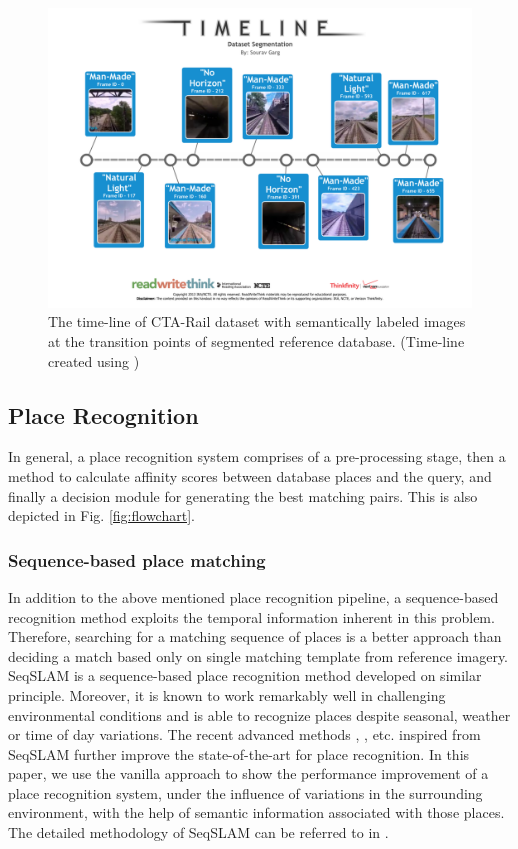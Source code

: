 \documentclass[letterpaper, 10 pt, conference]{ieeeconf}  %
\begin{document}
\begin{figure}
 \includegraphics[clip, trim=2cm 4cm 2cm 4cm,scale=0.33]{cta-dataset-segmentation-1}
 \caption{The time-line of CTA-Rail dataset with semantically labeled images at the transition points of segmented reference database. (Time-line created using \cite{timelineRWT})}
 \label{fig:datasetLabels}
\end{figure}

\subsection{Place Recognition}
In general, a place recognition system comprises of a pre-processing stage, then a method to calculate affinity scores between database places and the query, and finally a decision module for generating the best matching pairs. This is also depicted in Fig. \ref{fig:flowchart}.
\subsubsection{Sequence-based place matching}
In addition to the above mentioned place recognition pipeline, a sequence-based recognition method exploits the temporal information inherent in this problem. Therefore, searching for a matching sequence of places is a better approach than deciding a match based only on single matching template from reference imagery. SeqSLAM \cite{Milford2012} is a sequence-based place recognition method developed on similar principle. Moreover, it is known to work remarkably well in challenging environmental conditions and is able to recognize places despite seasonal, weather or time of day variations. The recent advanced methods \cite{milford2015sequence}, \cite{wang2015improved}, \cite{milford2015place} etc. inspired from SeqSLAM further improve the state-of-the-art for place recognition. In this paper, we use the vanilla approach to show the performance improvement of a place recognition system, under the influence of variations in the surrounding environment, with the help of semantic information associated with those places. The detailed methodology of SeqSLAM can be referred to in \cite{Milford2012}.
\end{document}
